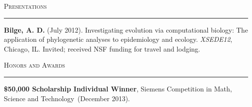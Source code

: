 \documentclass[11pt,letterpaper]{article}
\begin{document}
\begin{flushleft}
\LARGE \textsc{Presentations} \\ \vspace{11pt} \hrule \normalsize \vspace{0.5\baselineskip}

\begin{hangparas}{3em}{1}


\hspace{1em}\textbf{Bilge, A. D.} (July 2012). Investigating evolution via computational biology: The application of phylogenetic analyses to epidemiology and ecology. \emph{XSEDE12}, Chicago, IL. Invited; received NSF funding for travel and lodging.
\end{hangparas}

\LARGE \textsc{Honors and Awards} \\ \vspace{11pt} \hrule \normalsize \vspace{0.5\baselineskip}

\begin{hangparas}{3em}{1}

\hspace{1em}\textbf{\$50,000 Scholarship Individual Winner}, Siemens Competition in Math, Science and Technology~(December 2013).









\end{hangparas}

\end{flushleft}

\end{document}
